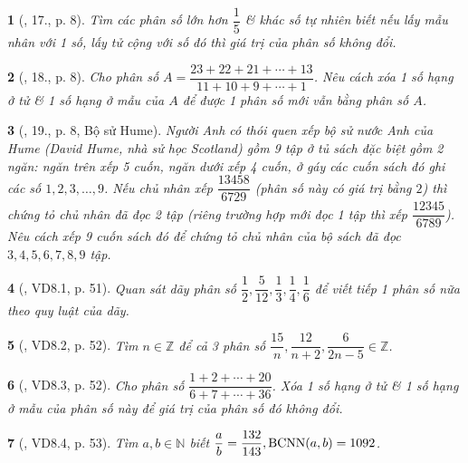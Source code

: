 \documentclass{article}
\newtheorem{baitoan}{}
\begin{document}
\begin{baitoan}[\cite{Binh_Toan_6_tap_2}, 17., p. 8]
	Tìm các phân số lớn hơn $\dfrac{1}{5}$ \& khác số tự nhiên biết nếu lấy mẫu nhân với 1 số, lấy tử cộng với số đó thì giá trị của phân số không đổi.
\end{baitoan}

\begin{baitoan}[\cite{Binh_Toan_6_tap_2}, 18., p. 8]
	Cho phân số $A = \dfrac{23 + 22 + 21 + \cdots + 13}{11 + 10 + 9 + \cdots + 1}$. Nêu cách xóa 1 số hạng ở tử \& 1 số hạng ở mẫu của $A$ để được 1 phân số mới vẫn bằng phân số $A$.
\end{baitoan}

\begin{baitoan}[\cite{Binh_Toan_6_tap_2}, 19., p. 8, Bộ sử Hume]
	Người Anh có thói quen xếp bộ sử nước Anh của Hume (David Hume, nhà sử học Scotland) gồm 9 tập ở tủ sách đặc biệt gồm 2 ngăn: ngăn trên xếp 5 cuốn, ngăn dưới xếp 4 cuốn, ở gáy các cuốn sách đó ghi các số $1,2,3,\ldots,9$. Nếu chủ nhân xếp $\dfrac{13458}{6729}$ (phân số này có giá trị bằng $2$) thì chứng tỏ chủ nhân đã đọc 2 tập (riêng trường hợp mới đọc 1 tập thì xếp $\dfrac{12345}{6789}$). Nêu cách xếp 9 cuốn sách đó để chứng tỏ chủ nhân của bộ sách đã đọc $3,4,5,6,7,8,9$ tập.
\end{baitoan}

\begin{baitoan}[\cite{TLCT_THCS_Toan_6_so_hoc}, VD8.1, p. 51]
	Quan sát dãy phân số $\dfrac{1}{2},\dfrac{5}{12},\dfrac{1}{3},\dfrac{1}{4},\dfrac{1}{6}$ để viết tiếp 1 phân số nữa theo quy luật của dãy.
\end{baitoan}

\begin{baitoan}[\cite{TLCT_THCS_Toan_6_so_hoc}, VD8.2, p. 52]
	Tìm $n\in\mathbb{Z}$ để cả 3 phân số $\dfrac{15}{n},\dfrac{12}{n + 2},\dfrac{6}{2n - 5}\in\mathbb{Z}$.
\end{baitoan}

\begin{baitoan}[\cite{TLCT_THCS_Toan_6_so_hoc}, VD8.3, p. 52]
	Cho phân số $\dfrac{1 + 2 + \cdots + 20}{6 + 7 + \cdots + 36}$. Xóa 1 số hạng ở tử \& 1 số hạng ở mẫu của phân số này để giá trị của phân số đó không đổi.
\end{baitoan}

\begin{baitoan}[\cite{TLCT_THCS_Toan_6_so_hoc}, VD8.4, p. 53]
	Tìm $a,b\in\mathbb{N}$ biết $\dfrac{a}{b} = \dfrac{132}{143},{\rm BCNN}(a,b) = 1092$.
\end{baitoan}
\end{document}
